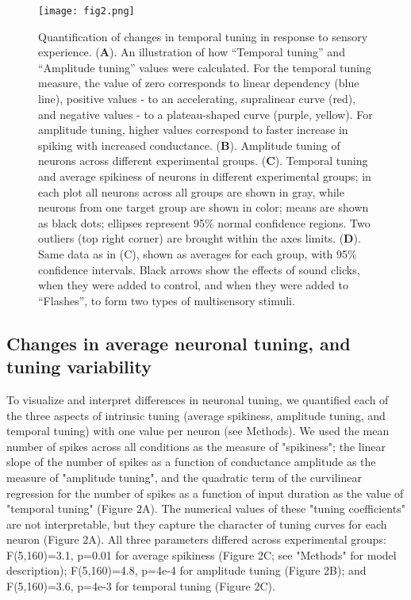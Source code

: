 \documentclass{article}
\begin{document}
\begin{figure*}[!t]
\texttt{[image: fig2.png]}
\caption{
Quantification of changes in temporal tuning in response to sensory experience. (\textbf{A}). An illustration of how “Temporal tuning” and “Amplitude tuning” values were calculated. For the temporal tuning measure, the value of zero corresponds to linear dependency (blue line), positive values - to an accelerating, supralinear curve (red), and negative values - to a plateau-shaped curve (purple, yellow). For amplitude tuning, higher values correspond to faster increase in spiking with increased conductance. (\textbf{B}). Amplitude tuning of neurons across different experimental groups. (\textbf{C}). Temporal tuning and average spikiness of neurons in different experimental groups; in each plot all neurons across all groups are shown in gray, while neurons from one target group are shown in color; means are shown as black dots; ellipses represent 95\% normal confidence regions. Two outliers (top right corner) are brought within the axes limits. (\textbf{D}). Same data as in (C), shown as averages for each group, with 95\% confidence intervals. Black arrows show the effects of sound clicks, when they were added to control, and when they were added to “Flashes”, to form two types of multisensory stimuli.}
\end{figure*}

\subsection*{Changes in average neuronal tuning, and tuning variability}

To visualize and interpret differences in neuronal tuning, we quantified each of the three aspects of intrinsic tuning (average spikiness, amplitude tuning, and temporal tuning) with one value per neuron (see Methods). We used the mean number of spikes across all conditions as the measure of "spikiness"; the linear slope of the number of spikes as a function of conductance amplitude as the measure of "amplitude tuning", and the quadratic term of the curvilinear regression for the number of spikes as a function of input duration as the value of "temporal tuning" (Figure 2A). The numerical values of these "tuning coefficients" are not interpretable, but they capture the character of tuning curves for each neuron (Figure 2A). All three parameters differed across experimental groups: F(5,160)=3.1, p=0.01 for average spikiness (Figure 2C; see "Methods" for model description); F(5,160)=4.8, p=4e-4 for amplitude tuning (Figure 2B); and F(5,160)=3.6, p=4e-3 for temporal tuning (Figure 2C).
\end{document}
